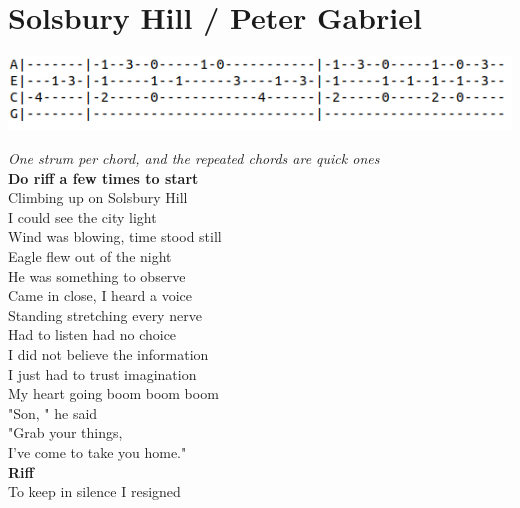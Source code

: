 \section{Solsbury Hill / Peter Gabriel}\label{sec:solsburyhill}
\includegraphics[scale=.6]{songs/s/solsburyhilltab.png}
\Fmajor
\Cmajor
\Dminor
\BflatMajorSeven
\Gminor
\Fmajor
\BflatMajor

\emph{One strum per chord, and the repeated chords are quick ones}\\
\textbf{Do riff a few times to start}\\
   Climbing up on Solsbury Hill\\
   I could see the city light\\
   Wind was blowing, time stood still\\
   Eagle flew out of the night\\
   He was something to observe\\
   Came in close, I heard a voice\\
   Standing stretching every nerve\\
   Had to listen had no choice\\
I did not believe the information\\
I just had to  trust imagination\\
My heart going  boom boom boom\\
"Son, " he  said  \\
"Grab your things,\\
I've come to take you home."\\
\textbf{Riff}\\
   To keep in silence I resigned\\
